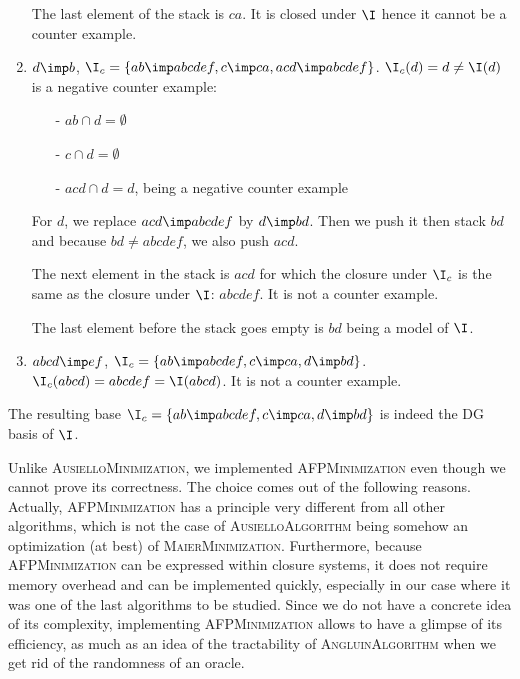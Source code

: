 \begin{enumerate}
	The last element of the stack is $ca$. It is closed under $\I$ hence it cannot be a counter example.
	
	\item $d \imp b$, $\I_c = \{ ab \imp abcdef, c \imp ca, acd \imp abcdef \}$.
	$\I_c(d) = d \neq \I(d)$ is a negative counter example:
	\begin{itemize}
		\item[-] $ab \cap d = \emptyset$
		\item[-] $c \cap d = \emptyset$
		\item[-] $acd \cap d = d$, being a negative counter example
	\end{itemize}
	For $d$, we replace $acd \imp abcdef$ by $d \imp bd$. Then we push it then stack $bd$ and because $bd \neq abcdef$, we also push $acd$.
	
	The next element in the stack is $acd$ for which the closure under $\I_c$
	is the same as the closure under $\I$: $abcdef$. It is not a counter example.
	
	The last element before the stack goes empty is $bd$ being a model of $\I$.
	
	\item $abcd \imp ef$, $\I_c = \{ ab \imp abcdef, c \imp ca, d \imp bd \}$.
	$\I_c(abcd) = abcdef = \I(abcd)$. It is not a counter example.
\end{enumerate}
\noindent The resulting base $\I_c =  \{ ab \imp abcdef, c \imp ca, d \imp bd \}$ is indeed the DG basis of $\I$.

\vspace{1.2em}

Unlike \textsc{AusielloMinimization}, we implemented \textsc{AFPMinimization}
even though we cannot prove its correctness. The choice comes out of the following reasons. Actually, \textsc{AFPMinimization} has a principle very
different from all other algorithms, which is not the case of \textsc{AusielloAlgorithm} being somehow an optimization (at best) of \textsc{MaierMinimization}. Furthermore, because \textsc{AFPMinimization} can be expressed within closure systems,
it does not require memory overhead and can be implemented quickly, especially in our case where it was one of the last algorithms to be studied. Since we do not have a concrete idea of its complexity, implementing \textsc{AFPMinimization} allows to have a glimpse of its efficiency, as much as
an idea of the tractability of \textsc{AngluinAlgorithm} when we get rid of 
the randomness of an oracle.

\vspace{1.2em}

